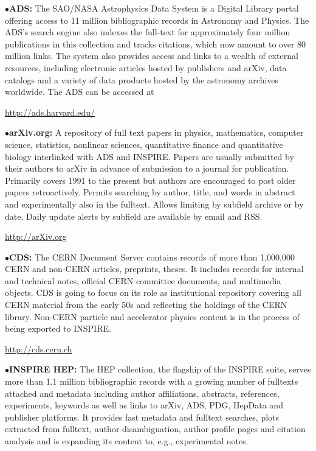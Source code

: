 \item{$\bullet$}{\bf ADS:} 
The SAO/NASA Astrophysics Data System is a Digital Library portal offering access to 11 million bibliographic records in Astronomy and Physics.  The ADS's search engine also indexes the full-text for approximately four million publications in this collection and tracks citations, which now amount to over 80 million links.  The system also provides access and links to a wealth of external resources, including electronic articles hosted by publishers and arXiv, data catalogs and a variety of data products hosted by the astronomy archives worldwide.  The ADS can be accessed at

       \item{}\qquad\url{http://ads.harvard.edu/}

\medskip

\item{$\bullet$}{\bf arXiv.org:}
A repository of full text papers in physics, mathematics, computer science, statistics, nonlinear sciences, quantitative finance and quantitative biology interlinked with ADS and INSPIRE. Papers are usually submitted by their authors to arXiv in advance of submission to a journal for publication. Primarily covers 1991 to the present but authors are encouraged to post older papers retroactively. Permits searching by author, title, and words in abstract and experimentally also in the fulltext. Allows limiting by subfield archive or by date. Daily update alerts by subfield are available by email and RSS.

	\item{}\qquad\url{http://arXiv.org}
\medskip

\item{$\bullet$}{\bf CDS:}
The CERN Document Server contains records of more than 1,000,000 CERN and non-CERN articles, preprints, theses. It includes records for internal and technical notes, official CERN committee documents, and multimedia objects. CDS is going to focus on its role as institutional repository covering all CERN material from the early 50s and reflecting the holdings of the CERN library. Non-CERN particle and accelerator physics content is in the process of being exported to INSPIRE.

      \item{}\qquad\url{http://cds.cern.ch}
\medskip

\item{$\bullet$}{\bf INSPIRE HEP:} 
The HEP collection, the flagship of the INSPIRE suite, serves more than 1.1 million bibliographic records with a growing number of fulltexts attached and metadata including author affiliations, abstracts, references, experiments, keywords as well as links to arXiv, ADS, PDG, HepData and publisher platforms. It provides fast metadata and fulltext searches, plots extracted from fulltext, author disambiguation, author profile pages and citation analysis and is expanding its content to, e.g., experimental notes.

